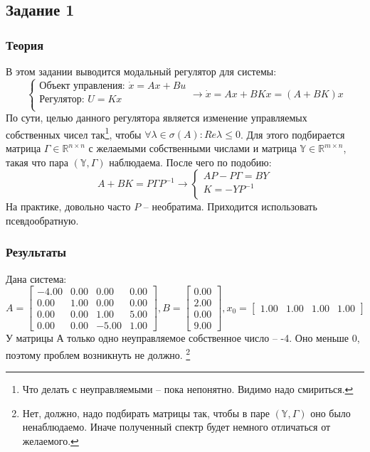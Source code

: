 \subsection{Задание 1}
\subsubsection{Теория}
В этом задании выводится модальный регулятор для системы:
\[
        \begin{cases}
                \text{Объект управления: }\dot{x} = A x + Bu \\
                \text{Регулятор: }U = K x \\
        \end{cases} \rightarrow
        \dot{x} = A x + BKx = (A+BK)x
\]
По сути, целью данного регулятора является изменение управляемых собственных чисел так\footnote{Что делать с неуправляемыми -- пока непонятно. Видимо надо смириться.}, чтобы \(\forall \lambda \in \sigma(A): Re{\lambda} \leq 0\). Для этого подбирается матрица \(\Gamma \in \mathds{R}^{n \times n}\) с желаемыми собственными числами и матрица \(\mathds{Y} \in \mathds{R}^{m \times n}\), такая что пара \((\mathds{Y}, \Gamma)\) наблюдаема. После чего по подобию:
\[A+BK = P \Gamma P^{-1} \rightarrow
        \begin{cases}
                AP - P\Gamma = BY \\
                K = -YP^{-1} \\
        \end{cases}
\]
На практике, довольно часто \(P\) -- необратима. Приходится использовать псевдообратную.

\subsubsection{Результаты}
Дана система:
\[A = \begin{bmatrix}
        -4.00 &  0.00 &  0.00 &  0.00\\
         0.00 &  1.00 &  0.00 &  0.00\\
         0.00 &  0.00 &  1.00 &  5.00\\
         0.00 &  0.00 & -5.00 &  1.00
       \end{bmatrix},
       B = \begin{bmatrix}
        0.00\\
        2.00\\
        0.00\\
        9.00
      \end{bmatrix},
      x_0 = \begin{bmatrix}
        1.00 &  1.00 &  1.00 &  1.00
      \end{bmatrix}
       \]
У матрицы А только одно неуправляемое собственное число -- -4. Оно меньше 0, поэтому проблем возникнуть не должно. \footnote{Нет, должно, надо подбирать матрицы так, чтобы в паре \((\mathds{Y}, \Gamma)\) оно было ненаблюдаемо. Иначе полученный спектр будет немного отличаться от желаемого.}

